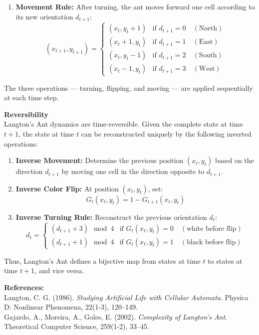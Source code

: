 \begin{technical}
\begin{enumerate}
\item \textbf{Movement Rule:}  
After turning, the ant moves forward one cell according to its new orientation $d_{t+1}$:
\[
(x_{t+1}, y_{t+1}) =
\begin{cases}
(x_t, y_t+1) & \text{if } d_{t+1} = 0 \quad (\text{North})\\
(x_t+1, y_t) & \text{if } d_{t+1} = 1 \quad (\text{East})\\
(x_t, y_t-1) & \text{if } d_{t+1} = 2 \quad (\text{South})\\
(x_t-1, y_t) & \text{if } d_{t+1} = 3 \quad (\text{West})
\end{cases}
\]
\end{enumerate}

The three operations — turning, flipping, and moving — are applied sequentially at each time step.

\textbf{Reversibility}\\[0.5em]
Langton's Ant dynamics are time-reversible. Given the complete state at time $t+1$, the state at time $t$ can be reconstructed uniquely by the following inverted operations:
\begin{enumerate}
\item \textbf{Inverse Movement:}  
Determine the previous position $(x_t, y_t)$ based on the direction $d_{t+1}$ by moving one cell in the direction opposite to $d_{t+1}$.

\item \textbf{Inverse Color Flip:}  
At position $(x_t, y_t)$, set:
\[
G_t(x_t, y_t) = 1 - G_{t+1}(x_t, y_t)
\]

\item \textbf{Inverse Turning Rule:}  
Reconstruct the previous orientation $d_t$:
\[
d_t =
\begin{cases}
(d_{t+1} + 3) \mod 4 & \text{if } G_t(x_t, y_t) = 0 \quad (\text{white before flip})\\
(d_{t+1} + 1) \mod 4 & \text{if } G_t(x_t, y_t) = 1 \quad (\text{black before flip})
\end{cases}
\]
\end{enumerate}

Thus, Langton’s Ant defines a bijective map from states at time $t$ to states at time $t+1$, and vice versa.

\vspace{0.5em}
\textbf{References:}\\[0.5em]
Langton, C. G. (1986). \textit{Studying Artificial Life with Cellular Automata}. Physica D: Nonlinear Phenomena, 22(1-3), 120–149.\\
Gajardo, A., Moreira, A., Goles, E. (2002). \textit{Complexity of Langton’s Ant}. Theoretical Computer Science, 259(1-2), 33–45.
\end{technical}
